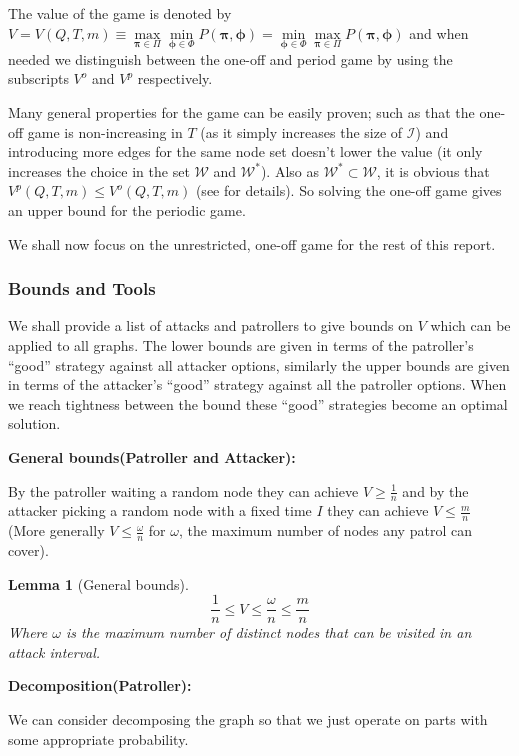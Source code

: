 \documentclass[a4paper,10pt]{article}
\newtheorem{lemma}[theorem]{Lemma}
\theoremstyle{definition}
\theoremstyle{definition}
\theoremstyle{remark}
\theoremstyle{definition}
\begin{document}
The value of the game is denoted by $V=V(Q,T,m) \equiv \max\limits_{\bm{\pi} \in \Pi} \min\limits_{\bm{\phi} \in \Phi} P(\bm{\pi},\bm{\phi})=\min\limits_{\bm{\phi} \in \Phi} \max\limits_{\bm{\pi} \in \Pi} P(\bm{\pi},\bm{\phi})$ and when needed we distinguish between the one-off and period game by using the subscripts $V^{o}$ and $V^p$ respectively.

Many general properties for the game can be easily proven; such as that the one-off game is non-increasing in $T$ (as it simply increases the size of $\mathcal{I}$) and introducing more edges for the same node set doesn't lower the value (it only increases the choice in the set $\mathcal{W}$ and $\mathcal{W}^*$). Also as $\mathcal{W}^* \subset \mathcal{W}$, it is obvious that $V^{p} (Q,T,m) \leq V^{o} (Q,T,m)$ (see \cite{Alpern2011} for details). So solving the one-off game gives an upper bound for the periodic game.

We shall now focus on the unrestricted, one-off game for the rest of this report.

\subsubsection{Bounds and Tools}
We shall provide a list of attacks and patrollers to give bounds on $V$ which can be applied to all graphs. The lower bounds are given in terms of the patroller's ``good'' strategy against all attacker options, similarly the upper bounds are given in terms of the attacker's ``good'' strategy against all the patroller options. When we reach tightness between the bound these ``good'' strategies become an optimal solution.

\textbf{General bounds(Patroller and Attacker):}

By the patroller waiting a random node they can achieve $V \geq \frac{1}{n}$ and by the attacker picking a random node with a fixed time $I$ they can achieve $V \leq \frac{m}{n}$ (More generally $V \leq \frac{\omega}{n}$ for $\omega$, the maximum number of nodes any patrol can cover).

\begin{lemma}[General bounds]
$$\frac{1}{n} \leq V \leq \frac{\omega}{n} \leq \frac{m}{n}$$
Where $\omega$ is the maximum number of distinct nodes that can be visited in an attack interval.
\end{lemma}

\textbf{Decomposition(Patroller):}

We can consider decomposing the graph so that we just operate on parts with some appropriate probability.
\end{document}
